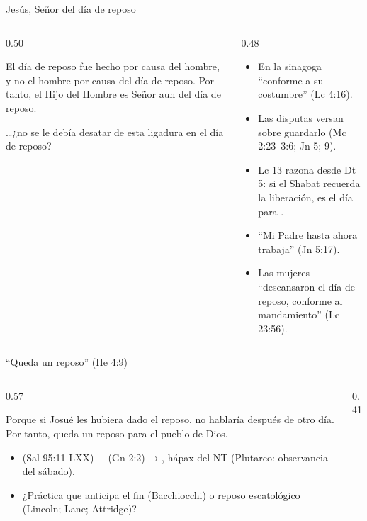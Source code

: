 \begin{frame}{Jesús, Señor del día de reposo}
\begin{columns}[t,onlytextwidth]
\begin{column}{0.50\textwidth}
\begin{cita}El día de reposo fue hecho por causa del hombre, y no el hombre por causa del día de reposo. Por tanto, el Hijo del Hombre es Señor aun del día de reposo.\end{cita}
\begin{cita}\ldots{}¿no se le debía desatar de esta ligadura en el día de reposo?\end{cita}
\end{column}
\begin{column}{0.48\textwidth}\scriptsize
\begin{itemize}
\item En la sinagoga ``conforme a su costumbre'' (Lc 4:16).
\item Las disputas versan sobre  guardarlo (Mc 2:23--3:6; Jn 5; 9).
\item Lc 13 razona desde Dt 5: si el Shabat recuerda la liberación, es el día para .
\item ``Mi Padre hasta ahora trabaja'' (Jn 5:17).
\item Las mujeres ``descansaron el día de reposo, conforme al mandamiento'' (Lc 23:56).
\end{itemize}
\end{column}
\end{columns}
\end{frame}

\begin{frame}{``Queda un reposo'' (He 4:9)}
\begin{columns}[c,onlytextwidth]
\begin{column}{0.57\textwidth}
\begin{cita}Porque si Josué les hubiera dado el reposo, no hablaría después de otro día. Por tanto, queda un reposo para el pueblo de Dios.\end{cita}
\scriptsize
\begin{itemize}
\item {} (Sal 95:11 LXX) +  (Gn 2:2) → , hápax del NT (Plutarco: observancia del sábado).
\item ¿Práctica que anticipa el fin (Bacchiocchi) o reposo escatológico (Lincoln; Lane; Attridge)?
\end{itemize}
\end{column}
\begin{column}{0.41\textwidth}\end{column}
\end{columns}
\end{frame}

